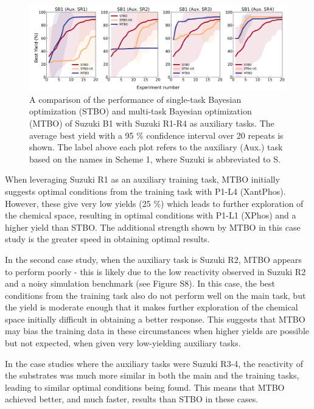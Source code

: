 \begin{figure}
    \centering
    \includegraphics[width=1.2\textwidth]{gfx/Chapter04/baumgartner_suzuki_reizman_suzuki_one_cotraining_optimization.png}
    \caption{A comparison of the performance of single-task Bayesian optimization (STBO) and multi-task Bayesian optimization (MTBO) of Suzuki B1 with Suzuki R1-R4 as auxiliary tasks. The average best yield with a 95 \% confidence interval over 20 repeats is shown. The label above each plot refers to the auxiliary (Aux.) task based on the names in Scheme 1, where Suzuki is abbreviated to S.}
    \label{fig:baumgartner_multitask}
\end{figure}

When leveraging Suzuki R1 as an auxiliary training task, MTBO initially suggests optimal conditions from the training task with P1-L4 (XantPhos). However, these give very low yields (25 \%) which leads to further exploration of the chemical space, resulting in optimal conditions with P1-L1 (XPhos) and a higher yield than STBO. The additional strength shown by MTBO in this case study is the greater speed in obtaining optimal results.

In the second case study, when the auxiliary task is Suzuki R2, MTBO appears to perform poorly - this is likely due to the low reactivity observed in Suzuki R2 and a noisy simulation benchmark (see Figure S8). In this case, the best conditions from the training task also do not perform well on the main task, but the yield is moderate enough that it makes further exploration of the chemical space initially difficult in obtaining a better response. This suggests that MTBO may bias the training data in these circumstances when higher yields are possible but not expected, when given very low-yielding auxiliary tasks. 

In the case studies where the auxiliary tasks were Suzuki R3-4, the reactivity of the substrates was much more similar in both the main and the training tasks, leading to similar optimal conditions being found. This means that MTBO achieved better, and much faster, results than STBO in these cases. 

